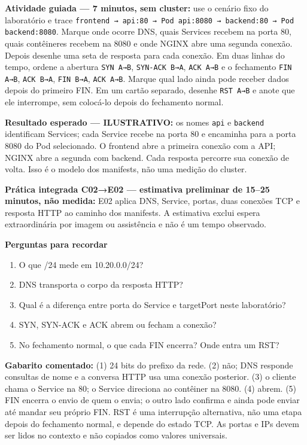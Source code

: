 \documentclass[12pt,openany,oneside,a4paper,chapter=TITLE,english,brazil]{abntex2}
\providecommand{\tightlist}{\setlength{\itemsep}{0pt}\setlength{\parskip}{0pt}}
\begin{document}
\textbf{Atividade guiada --- 7 minutos, sem cluster:} use o cenário fixo do laboratório e trace \texttt{frontend → api:\allowbreak{}80 → Pod api:\allowbreak{}8080 → backend:\allowbreak{}80 → Pod backend:\allowbreak{}8080}. Marque onde ocorre DNS, quais Services recebem na porta 80, quais contêineres recebem na 8080 e onde NGINX abre uma segunda conexão. Depois desenhe uma seta de resposta para cada conexão. Em duas linhas do tempo, ordene a abertura \texttt{SYN A→B}, \texttt{SYN-{}\allowbreak{}ACK B→A}, \texttt{ACK A→B} e o fechamento \texttt{FIN A→B}, \texttt{ACK B→A}, \texttt{FIN B→A}, \texttt{ACK A→B}. Marque qual lado ainda pode receber dados depois do primeiro FIN. Em um cartão separado, desenhe \texttt{RST A→B} e anote que ele interrompe, sem colocá-lo depois do fechamento normal.

\textbf{Resultado esperado --- ILUSTRATIVO:} os nomes \texttt{api} e \texttt{backend} identificam Services; cada Service recebe na porta 80 e encaminha para a porta 8080 do Pod selecionado. O frontend abre a primeira conexão com a API; NGINX abre a segunda com backend. Cada resposta percorre sua conexão de volta. Isso é o modelo dos manifests, não uma medição do cluster.

\textbf{Prática integrada C02→E02 --- estimativa preliminar de 15--25 minutos, não medida:} E02 aplica DNS, Service, portas, duas conexões TCP e resposta HTTP ao caminho dos manifests. A estimativa exclui espera extraordinária por imagem ou assistência e não é um tempo observado.

\clearpage

\textbf{Perguntas para recordar}

\begin{enumerate}
\def\labelenumi{\arabic{enumi}.}
\tightlist
\item
  O que /24 mede em 10.20.0.0/24?
\item
  DNS transporta o corpo da resposta HTTP?
\item
  Qual é a diferença entre porta do Service e targetPort neste laboratório?
\item
  SYN, SYN-ACK e ACK abrem ou fecham a conexão?
\item
  No fechamento normal, o que cada FIN encerra? Onde entra um RST?
\end{enumerate}

\textbf{Gabarito comentado:} (1) 24 bits do prefixo da rede. (2) não; DNS responde consultas de nome e a conversa HTTP usa uma conexão posterior. (3) o cliente chama o Service na 80; o Service direciona ao contêiner na 8080. (4) abrem. (5) FIN encerra o envio de quem o envia; o outro lado confirma e ainda pode enviar até mandar seu próprio FIN. RST é uma interrupção alternativa, não uma etapa depois do fechamento normal, e depende do estado TCP. As portas e IPs devem ser lidos no contexto e não copiados como valores universais.
\end{document}
